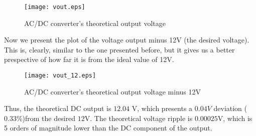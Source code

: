  \begin{figure}[H]
   \centering
   \texttt{[image: vout.eps]}
   \caption{AC/DC converter's theoretical output voltage}
   \label{fig:VoltageRegulatorOutput}
 \end{figure}

Now we present the plot of the voltage output minus 12V (the desired voltage). This is, clearly, similar to the one presented before, but it gives us a better prespective of how far it is from the ideal value of 12V.
 \begin{figure}[H]
   \centering
   \texttt{[image: vout\_12.eps]}
   \caption{AC/DC converter's theoretical output voltage minus 12V}
   \label{fig:VoltageRegulatorOutput}
 \end{figure}



Thus, the theoretical DC output is $12.04$ V, which presents a $0.04V$ deviation ($0.33$\%)from the desired $12$V. The theoretical voltage ripple is $0.00025$V, which is 5 orders of magnitude lower than the DC component of the output.
